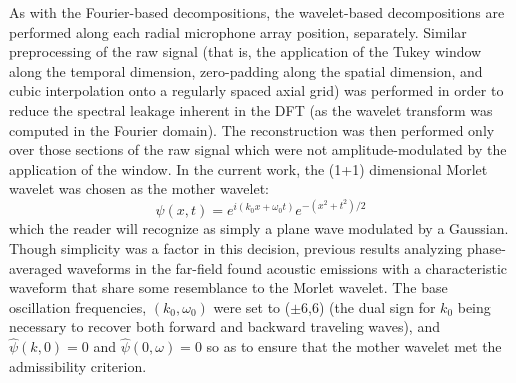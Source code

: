 \documentclass[english]{aiaa-tc}
\begin{document}
As with the Fourier-based decompositions, the wavelet-based decompositions are performed along each radial microphone array position, separately. Similar preprocessing of the raw signal (that is, the application of the Tukey window along the temporal dimension, zero-padding along the spatial dimension, and cubic interpolation onto a regularly spaced axial grid) was performed in order to reduce the spectral leakage inherent in the DFT (as the wavelet transform was computed in the Fourier domain). The reconstruction was then performed only over those sections of the raw signal which were not amplitude-modulated by the application of the window. In the current work, the (1+1) dimensional Morlet wavelet was chosen as the mother wavelet:
\begin{equation}
\psi(x,t)=e^{i(k_{0}x+\omega_{0}t)}e^{-(x^{2}+t^{2})/2}
\end{equation}
which the reader will recognize as simply a plane wave modulated by a Gaussian. Though simplicity was a factor in this decision, previous results analyzing phase-averaged waveforms in the far-field found acoustic emissions with a characteristic waveform that share some resemblance to the Morlet wavelet\cite{Crawley2014}. The base oscillation frequencies, $(k_{0},\omega_{0})$ were set to ($\pm$6,6) (the dual sign for $k_{0}$ being necessary to recover both forward and backward traveling waves), and $\hat{\psi}(k,0)=0$ and $\hat{\psi} (0,\omega) =0$ so as to ensure that the mother wavelet met the admissibility criterion.
\end{document}
